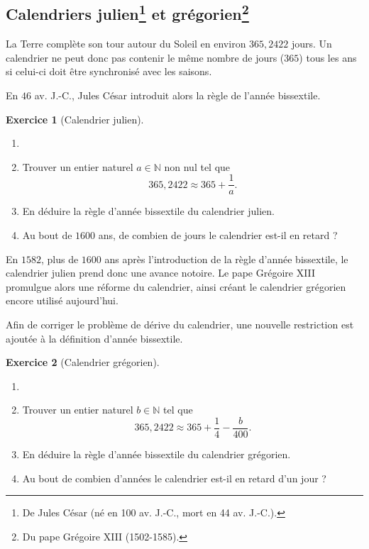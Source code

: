 \documentclass[a4paper, 14pt]{extarticle}
\theoremstyle{plain}
\theoremstyle{definition}
\newtheorem{ex}{Exercice}
\newcommand{\N}{\mathbb{N}}
\begin{document}
\pagestyle{fancy}
\fancyhead[R]{\today}


\subsection*{Calendriers julien\footnote{De Jules César (né en 100 av. J.-C., mort en 44 av. J.-C.).} et grégorien\footnote{Du pape Grégoire XIII (1502-1585).}}

La Terre complète son tour autour du Soleil en environ $365{,}2422$ jours. 
Un calendrier ne peut donc pas contenir le même nombre de jours ($365$) tous les ans si celui-ci doit être synchronisé avec les saisons.

En $46$ av. J.-C., Jules César introduit alors la règle de l'année bissextile.

\begin{ex}[Calendrier julien]
	\begin{enumerate}
		\item[]
		\item
		Trouver un entier naturel $a \in \N$ non nul tel que
			\[ 365{,}2422 \approx 365 + \dfrac1a.\]

		\item
		En déduire la règle d'année bissextile du calendrier julien.
		
		\item Au bout de $1600$ ans, de combien de jours le calendrier est-il en retard ?
	\end{enumerate}
\end{ex}

En $1582$, plus de $1600$ ans après l'introduction de la règle d'année bissextile, le calendrier julien prend donc une avance notoire.
Le pape Grégoire XIII promulgue alors une réforme du calendrier, ainsi créant le calendrier grégorien encore utilisé aujourd'hui.

Afin de corriger le problème de dérive du calendrier, une nouvelle restriction est ajoutée à la définition d'année bissextile.

\begin{ex}[Calendrier grégorien]
	\begin{enumerate}
		\item[]
		\item
		Trouver un entier naturel $b \in \N$ tel que
			\[ 365{,}2422 \approx 365 + \dfrac14 - \dfrac{b}{400}.\]

		\item  En déduire la règle d'année bissextile du calendrier grégorien.
		
		\item Au bout de combien d'années le calendrier est-il en retard d'un jour ?
	\end{enumerate}
\end{ex}
\end{document}

